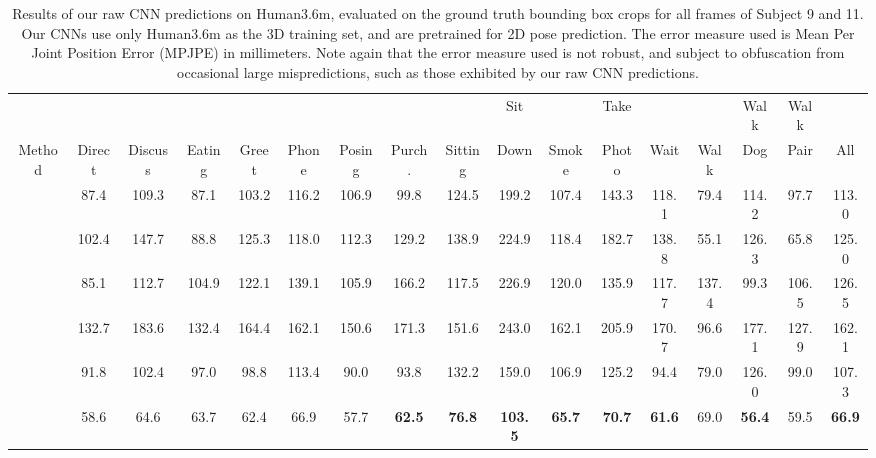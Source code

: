 \documentclass[acmtog]{acmart}
\begin{document}
\begin{table*}[]
\centering
\caption{Results of our raw CNN predictions on Human3.6m, evaluated on the ground truth bounding box crops for all frames of Subject 9 and 11. Our CNNs use only Human3.6m as the 3D training set, and are pretrained for 2D pose prediction. The error measure used is Mean Per Joint Position Error (MPJPE) in millimeters. Note again that the error measure used is not robust, and subject to obfuscation from occasional large mispredictions, such as those exhibited by our raw CNN predictions.}
\label{tbl:h34m}
\renewcommand{\tabcolsep}{2pt}
\begin{tabular}{l||c|c|c|c|c|c|c|c|c|c|c|c|c|c|c||c}
                &        &         &        &       &       &        &        &         & Sit   &       & Take  &       &       & Walk  & Walk  & \multicolumn{1}{l}{} \\
\multicolumn{1}{c||}{Method}                      & Direct & Discuss & Eating & Greet & Phone & Posing & Purch. & Sitting & Down  & Smoke & Photo & Wait  & Walk  & Dog   & Pair  & All                  \\ \hline \hline
\cite{zhou_sparseness_deepness_cvpr15}     & 87.4   & 109.3   & 87.1   & 103.2 & 116.2 & 106.9  & 99.8   & 124.5   & 199.2 & 107.4 & 143.3 & 118.1 & 79.4  & 114.2 & 97.7  & 113.0                \\
\cite{tekin_motion_comp_cvpr16}   & 102.4  & 147.7   & 88.8   & 125.3 & 118.0 & 112.3  & 129.2  & 138.9   & 224.9 & 118.4 & 182.7 & 138.8 & 55.1  & 126.3 & 65.8  & 125.0                \\
\cite{yu_mono_heightmap_eccv16}          & 85.1   & 112.7   & 104.9  & 122.1 & 139.1 & 105.9  & 166.2  & 117.5   & 226.9 & 120.0 & 135.9 & 117.7 & 137.4 & 99.3  & 106.5 & 126.5                \\ \hline
\cite{ionescu_human36_pami14}                & 132.7  & 183.6   & 132.4  & 164.4 & 162.1 & 150.6  & 171.3  & 151.6   & 243.0 & 162.1 & 205.9 & 170.7 & 96.6  & 177.1 & 127.9 & 162.1                \\
\cite{zhou_deep_kinematic_arxiv16}       & 91.8   & 102.4   & 97.0   & 98.8  & 113.4 & 90.0   & 93.8   & 132.2   & 159.0 & 106.9 & 125.2 & 94.4  & 79.0  & 126.0 & 99.0  & 107.3                \\
\cite{pavlakos_volumetric3d_arxiv16} & 58.6   & 64.6    & 63.7   & 62.4  & 66.9  & 57.7   & \textbf{62.5}   & \textbf{76.8}    & \textbf{103.5} & \textbf{65.7}  & \textbf{70.7}  & \textbf{61.6}  & 69.0  & \textbf{56.4}  & 59.5  & \textbf{66.9}                 \\

\end{tabular}
\end{table*}
\end{document}
